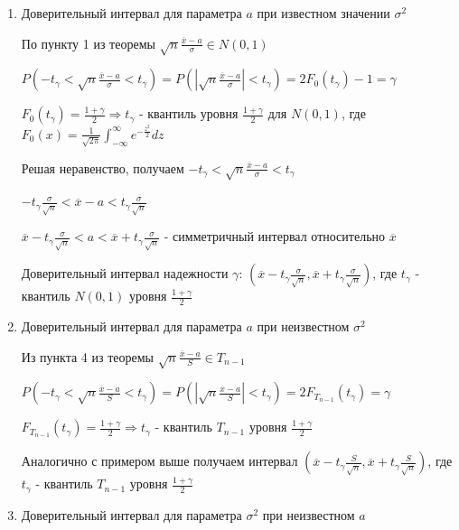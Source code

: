 \begin{enumerate}[label*=\Roman*.]
    \item Доверительный интервал для параметра $a$ при известном значении $\sigma^2$

    По пункту 1 из теоремы $\sqrt{n} \frac{\overline{x} - a}{\sigma} \in N(0, 1)$ 

    $P\left(-t_\gamma < \sqrt{n} \frac{\overline{x} - a}{\sigma} < t_\gamma\right) = 
    P\left(\left|\sqrt{n} \frac{\overline{x} - a}{\sigma}\right| < t_\gamma\right) = 2F_0 (t_\gamma) - 1 = \gamma$

    $F_0(t_\gamma) = \frac{1 + \gamma}{2} \Longrightarrow t_\gamma$ - квантиль уровня 
    $\frac{1 + \gamma}{2}$ для $N(0, 1)$, где
    $F_0(x) = \frac{1}{\sqrt{2\pi}} \int_{-\infty}^{\infty} e^{-\frac{z^2}{2}} dz$

    Решая неравенство, получаем $-t_\gamma < \sqrt{n} \frac{\overline{x} - a}{\sigma} < t_\gamma$

    $-t_\gamma \frac{\sigma}{\sqrt{n}} < \overline{x} - a < t_\gamma \frac{\sigma}{\sqrt{n}}$

    $\overline{x} - t_\gamma \frac{\sigma}{\sqrt{n}} < a < \overline{x} + t_\gamma \frac{\sigma}{\sqrt{n}}$ - 
    симметричный интервал относительно $\overline{x}$

    Доверительный интервал надежности $\gamma$: $\left(\overline{x} - t_\gamma \frac{\sigma}{\sqrt{n}}, 
    \overline{x} + t_\gamma \frac{\sigma}{\sqrt{n}}\right)$, 
    где $t_\gamma$ - квантиль $N(0, 1)$ уровня $\frac{1 + \gamma}{2}$

    \item Доверительный интервал для параметра $a$ при неизвестном $\sigma^2$

    Из пункта 4 из теоремы $\sqrt{n} \frac{\overline{x} - a}{S} \in T_{n - 1}$

    $P\left(-t_\gamma < \sqrt{n} \frac{\overline{x} - a}{S} < t_\gamma\right) = P\left(\left|\sqrt{n} \frac{\overline{x} - a}{S}\right| < t_\gamma\right) = 2F_{T_{n - 1}}(t_\gamma) = \gamma$

    $F_{T_{n - 1}}(t_\gamma) = \frac{1 + \gamma}{2} \Longrightarrow t_\gamma$ - квантиль $T_{n - 1}$ уровня 
    $\frac{1 + \gamma}{2}$

    Аналогично с примером выше получаем интервал $\left(\overline{x} - t_\gamma \frac{S}{\sqrt{n}}, 
    \overline{x} + t_\gamma \frac{S}{\sqrt{n}}\right)$, 
    где $t_\gamma$ - квантиль $T_{n - 1}$ уровня $\frac{1 + \gamma}{2}$

    \item Доверительный интервал для параметра $\sigma^2$ при неизвестном $a$


\end{enumerate}
